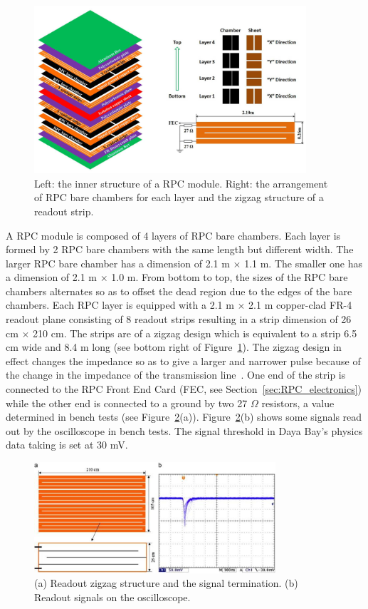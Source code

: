 \begin{figure}
	\centering
	\includegraphics[width=0.9\textwidth]{figures/chap5/RPC_inner_structure.eps}
	\caption{Left: the inner structure of a RPC module. Right: the arrangement of RPC bare chambers for each layer and the zigzag structure of a readout strip.}
	\label{fig:module_inner_structure}
\end{figure}
A RPC module is composed of 4 layers of RPC bare chambers. Each layer is formed by 2 RPC bare chambers with the same length but different width. The larger RPC bare chamber has a dimension of 2.1 m $\times$ 1.1 m. The smaller one has a dimension of 2.1 m $\times$ 1.0 m. From bottom to top, the sizes of the RPC bare chambers alternates so as to offset the dead region due to the edges of the bare chambers. Each RPC layer is equipped with a 2.1 m $\times$ 2.1 m copper-clad FR-4 readout plane consisting of 8 readout strips resulting in a strip dimension of 26 cm $\times$ 210 cm. The strips are of a zigzag design which is equivalent to a strip 6.5 cm wide and 8.4 m long (see bottom right of Figure~\ref{fig:module_inner_structure}). The zigzag design in effect changes the impedance so as to give a larger and narrower pulse because of the change in the impedance of the transmission line~\cite{Riegler2002}. One end of the strip is connected to the RPC Front End Card (FEC, see Section~\ref{sec:RPC_electronics}) while the other end is connected to a ground by two 27 $\Omega$ resistors, a value determined in bench tests (see Figure~\ref{fig:RPC_signal}(a)). Figure~\ref{fig:RPC_signal}(b) shows some signals read out by the oscilloscope in bench tests. The signal threshold in Daya Bay's physics data taking is set at 30 mV.
\begin{figure}
  \centering
  \includegraphics[width=0.8\textwidth]{figures/chap5/RPC_signal.eps}
  \caption{(a) Readout zigzag structure and the signal termination. (b) Readout signals on the oscilloscope.}
  \label{fig:RPC_signal}
\end{figure}
